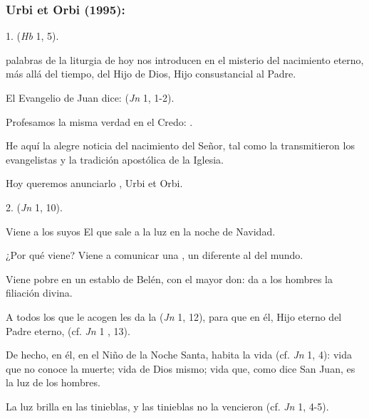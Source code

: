 \subsubsection{Urbi et Orbi (1995):}

\begin{body}
	1.  (\emph{Hb} 1, 5).
	
	 palabras de la liturgia de hoy nos introducen en el misterio del nacimiento eterno, más allá del tiempo, del Hijo de Dios, Hijo consustancial al Padre.
	
	El Evangelio de Juan dice:  (\emph{Jn} 1, 1-2).
	
	Profesamos la misma verdad en el Credo: .
	
	He aquí la alegre noticia del nacimiento del Señor, tal como la transmitieron los evangelistas y la tradición apostólica de la Iglesia.
	
	Hoy queremos anunciarlo , Urbi et Orbi.
	
	2.  (\emph{Jn} 1, 10).
	
	Viene a los suyos El que sale a la luz en la noche de Navidad.
	
	¿Por qué viene? Viene a comunicar una , un  diferente al del mundo.
	
	Viene pobre en un establo de Belén, con el mayor don: da a los hombres la filiación divina.
	
	A todos los que le acogen les da la  (\emph{Jn} 1, 12), para que en él, Hijo eterno del Padre eterno,  (cf. \emph{Jn} 1 , 13).
	
	De hecho, en él, en el Niño de la Noche Santa, habita la vida (cf. \emph{Jn} 1, 4): vida que no conoce la muerte; vida de Dios mismo; vida que, como dice San Juan, es la luz de los hombres.
	
	La luz brilla en las tinieblas, y las tinieblas no la vencieron (cf. \emph{Jn} 1, 4-5).
	

\end{body}
